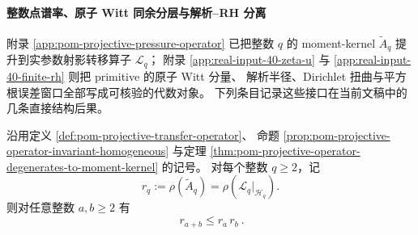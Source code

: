 
\paragraph{整数点谱率、原子 Witt 同余分层与解析--RH 分离}
附录 \ref{app:pom-projective-pressure-operator} 已把整数 \(q\) 的 moment-kernel
\(\widetilde A_q\) 提升到实参数射影转移算子 \(\mathcal L_q\)；
附录 \ref{app:real-input-40-zeta-u} 与
\ref{app:real-input-40-finite-rh} 则把 primitive 的原子 Witt 分量、
解析半径、Dirichlet 扭曲与平方根误差窗口全部写成可核验的代数对象。
下列条目记录这些接口在当前文稿中的几条直接结构后果。

\begin{theorem}\label{thm:xi-projective-moment-radius-submultiplicative}
沿用定义 \ref{def:pom-projective-transfer-operator}、
命题 \ref{prop:pom-projective-operator-invariant-homogeneous}
与定理 \ref{thm:pom-projective-operator-degenerates-to-moment-kernel} 的记号。
对每个整数 \(q\ge 2\)，记
\[
r_q:=\rho(\widetilde A_q)=\rho(\mathcal L_q|_{\mathcal H_q}).
\]
则对任意整数 \(a,b\ge 2\) 有
\[
\boxed{\ r_{a+b}\le r_a\,r_b\ }.
\]
\end{theorem}
